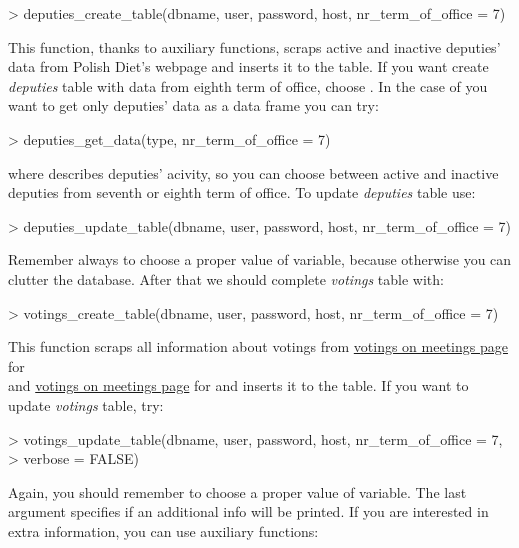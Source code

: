 \begin{example}
> deputies_create_table(dbname, user, password, host, nr_term_of_office = 7)
\end{example}

This function, thanks to auxiliary functions, scraps active and inactive deputies' data from Polish Diet's webpage and inserts it to the table. If you want create \emph{deputies} table with data from eighth term of office, choose .
In the case of you want to get only deputies' data as a data frame you can try:

\begin{example}
> deputies_get_data(type, nr_term_of_office = 7)
\end{example}

where  describes deputies' acivity, so you can choose between active and inactive deputies from seventh or eighth term of office. To update \emph{deputies} table use:

\begin{example}
> deputies_update_table(dbname, user, password, host, nr_term_of_office = 7)
\end{example}

Remember always to choose a proper value of  variable, because otherwise you can clutter the database. After that we should complete \emph{votings} table with:

\begin{example}
> votings_create_table(dbname, user, password, host, nr_term_of_office = 7)
\end{example}

This function scraps all information about votings from \href{http://www.sejm.gov.pl/Sejm7.nsf/agent.xsp?symbol=posglos&NrKadencji=7}{votings on meetings page} for \\  and \href{http://www.sejm.gov.pl/Sejm8.nsf/agent.xsp?symbol=posglos&NrKadencji=8}{votings on meetings page} for  and inserts it to the table. If you want to update \emph{votings} table, try:

\begin{example}
> votings_update_table(dbname, user, password, host, nr_term_of_office = 7,
> 	verbose = FALSE)
\end{example}

Again, you should remember to choose a proper value of  variable. The last argument specifies if an additional info will be printed. If you are interested in extra information, you can use auxiliary functions:

